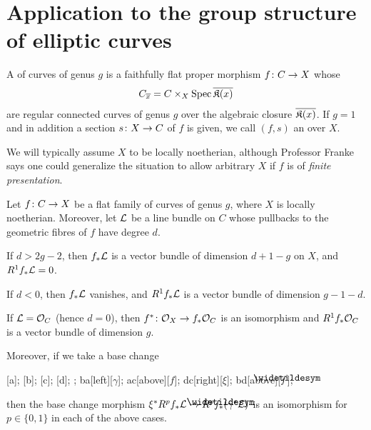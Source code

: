\documentclass[a4paper,parskip=half,numbers=enddot, DIV=12]{scrreprt}
\begin{document}
\section{Application to the group structure of elliptic curves}
\begin{defi}
	A  of curves of genus $g$ is a faithfully flat proper morphism $f\colon C\morphism X$ whose 
	\begin{align*}
		C_{\overline{x}}=C\times_X\operatorname{Spec}\overline{\mathfrak{K}(x)}
	\end{align*}
	are regular connected curves of genus $g$ over the algebraic closure $\overline{\mathfrak{K}(x)}$. If $g=1$ and in addition a section  $s\colon X\morphism C$  of $f$ is given, we call $(f,s)$ an  over $X$.
\end{defi}
We will typically assume $X$ to be locally noetherian, although Professor Franke says one could generalize the situation to allow arbitrary $X$ if $f$ is of \emph{finite presentation}.
\begin{prop}
	Let $f\colon C\morphism X$ be a flat family of curves of genus $g$, where $X$ is locally noetherian. Moreover, let $\mathcal{L}$ be a line bundle on $C$ whose pullbacks to the geometric fibres of $f$ have degree $d$.
	\begin{alphanumerate}
		\item If $d>2g-2$, then $f_*\mathcal{L}$ is a vector bundle of dimension $d+1-g$ on $X$, and $R^1f_*\mathcal{L}=0$.
		\item If $d<0$, then $f_*\mathcal{L}$ vanishes, and $R^1f_*\mathcal{L}$ is a vector bundle of dimension $g-1-d$.
		\item If $\mathcal{L}=\mathcal{O}_C$ (hence $d=0$), then $f^*\colon \Oo_X\morphism f_*\Oo_C$ is an isomorphism and $R^1f_*\mathcal{O}_C$ is a vector bundle of dimension $g$.
	\end{alphanumerate}
	Moreover, if we take a base change
	\begin{diagram*}
		[a];
		[b];
		[c];
		[d];
		;
		\scriptsize
		\arrow ba[left][$\gamma$];
		\arrow ac[above][$f$];
		\arrow dc[right][$\xi$];
		\arrow bd[above][$\snake{f}$];
	\end{diagram*}
	then the base change morphism $\xi^*R^pf_*\Ll\morphism R^p\snake{f}_*(\gamma^*\Ll)$ is an isomorphism for $p\in\{0,1\}$ in each of the above cases.
\end{prop}
\end{document}
